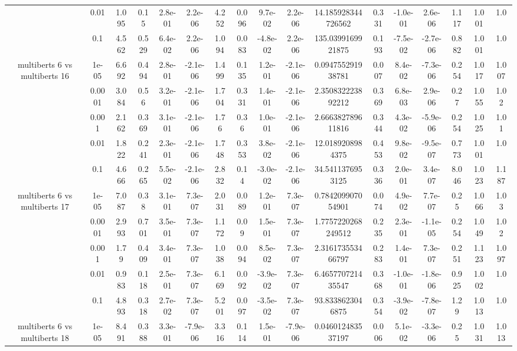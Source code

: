 \begin{tabular}{|c|c|c|c|c|c|c|c|c|c|c|c|c|c|c|c|c|}
 & 0.01 & 1.095 & 0.15 & 2.8e-01 & 2.2e-06 & 4.252 & 0.096 & 9.7e-02 & 2.2e-06 & 14.185928344726562 & 0.331 & -1.0e-01 & 2.6e-06 & 1.117 & 1.001 & 1.0 \\
 & 0.1 & 4.562 & 0.529 & 6.4e-02 & 2.2e-06 & 1.094 & 0.083 & -4.8e-02 & 2.2e-06 & 135.0399169921875 & 0.193 & -7.5e-02 & -2.7e-06 & 0.882 & 1.001 & 1.0 \\
\hline
\multirow{5}{*}{multiberts 6 vs multiberts 16} & 1e-05 & 6.692 & 0.494 & 2.8e-01 & -2.1e-06 & 1.499 & 0.135 & 1.2e-01 & -2.1e-06 & 0.094755291938781 & 0.007 & 8.4e-02 & -7.3e-06 & 0.254 & 1.017 & 1.007 \\
 & 0.0001 & 3.084 & 0.56 & 3.2e-01 & -2.1e-06 & 1.704 & 0.331 & 1.4e-01 & -2.1e-06 & 2.350832223892212 & 0.369 & 6.8e-03 & 2.9e-06 & 0.27 & 1.055 & 1.02 \\
 & 0.001 & 2.162 & 0.369 & 3.1e-01 & -2.1e-06 & 1.76 & 0.36 & 1.0e-01 & -2.1e-06 & 2.666382789611816 & 0.344 & 4.3e-02 & -5.9e-06 & 0.254 & 1.025 & 1.01 \\
 & 0.01 & 1.822 & 0.241 & 2.3e-01 & -2.1e-06 & 1.748 & 0.353 & 3.8e-02 & -2.1e-06 & 12.0189208984375 & 0.453 & 9.8e-02 & -9.5e-07 & 0.773 & 1.001 & 1.0 \\
 & 0.1 & 4.666 & 0.265 & 5.5e-02 & -2.1e-06 & 2.832 & 0.14 & -3.0e-02 & -2.1e-06 & 34.5411376953125 & 0.336 & 2.0e-01 & 3.4e-07 & 8.046 & 1.023 & 1.187 \\
\hline
\multirow{5}{*}{multiberts 6 vs multiberts 17} & 1e-05 & 7.087 & 0.38 & 3.1e-01 & 7.3e-07 & 2.031 & 0.089 & 1.2e-01 & 7.3e-07 & 0.784209907054901 & 0.074 & 4.9e-02 & 7.7e-07 & 0.25 & 1.066 & 1.03 \\
 & 0.0001 & 2.993 & 0.701 & 3.5e-01 & 7.3e-07 & 1.172 & 0.09 & 1.5e-01 & 7.3e-07 & 1.7757220268249512 & 0.235 & 2.3e-01 & -1.1e-05 & 0.254 & 1.049 & 1.02 \\
 & 0.001 & 1.79 & 0.409 & 3.4e-01 & 7.3e-07 & 1.038 & 0.094 & 8.5e-02 & 7.3e-07 & 2.316173553466797 & 0.283 & 1.4e-01 & 7.3e-07 & 0.251 & 1.123 & 1.097 \\
 & 0.01 & 0.983 & 0.118 & 2.5e-01 & 7.3e-07 & 6.169 & 0.092 & -3.9e-02 & 7.3e-07 & 6.465770721435547 & 0.368 & -1.0e-01 & -1.8e-06 & 0.925 & 1.002 & 1.0 \\
 & 0.1 & 4.893 & 0.318 & 2.7e-02 & 7.3e-07 & 5.201 & 0.097 & -3.5e-02 & 7.3e-07 & 93.8338623046875 & 0.354 & -3.9e-02 & -7.8e-07 & 1.29 & 1.013 & 1.0 \\
\hline
\multirow{5}{*}{multiberts 6 vs multiberts 18} & 1e-05 & 8.491 & 0.388 & 3.3e-01 & -7.9e-06 & 3.316 & 0.114 & 1.5e-01 & -7.9e-06 & 0.046012483537197 & 0.006 & 5.1e-02 & -3.3e-06 & 0.25 & 1.031 & 1.013 \\

\end{tabular}
